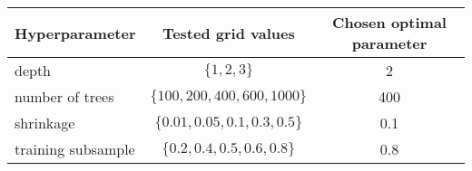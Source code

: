 \begin{tabular}{|lcc|}
    \hline
    Hyperparameter     & Tested grid values       & Chosen optimal parameter \\
    \hline 
    depth              & $\{1,2,3\}$                  & 2    \\
    number of trees    & $\{100, 200, 400, 600, 1000\}$ & 400  \\
    shrinkage          & $\{0.01, 0.05, 0.1, 0.3 ,0.5\}$          & 0.1  \\
    training subsample & $\{0.2, 0.4, 0.5, 0.6, 0.8\}$  & 0.8  \\
    \hline
\end{tabular}

